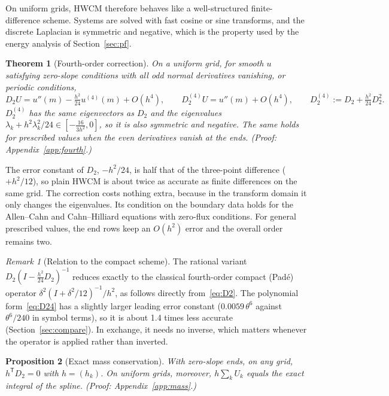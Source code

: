 \documentclass[preprint,12pt]{elsarticle}
\newtheorem{theorem}{Theorem}
\newtheorem{proposition}[theorem]{Proposition}
\theoremstyle{remark}
\newtheorem{remark}{Remark}
\newcommand{\proofin}[1]{\hfill{\small\emph{(Proof: Appendix~\ref{#1}.)}}}
\begin{document}
On uniform grids, HWCM therefore behaves like a well-structured finite-difference scheme. Systems are
solved with fast cosine or sine transforms, and the discrete Laplacian is symmetric and negative, which
is the property used by the energy analysis of Section~\ref{sec:pf}.

\begin{theorem}[Fourth-order correction]\label{thm:fourth}
On a uniform grid, for smooth $u$ satisfying zero-slope conditions with all odd normal derivatives
vanishing, or periodic conditions,
\begin{equation}\label{eq:D24}
D_2U=u''(m)-\tfrac{h^2}{24}u^{(4)}(m)+O(h^4),\qquad
D_2^{(4)}U=u''(m)+O(h^4),\qquad D_2^{(4)}:=D_2+\tfrac{h^2}{24}D_2^2 .
\end{equation}
$D_2^{(4)}$ has the same eigenvectors as $D_2$ and the eigenvalues
$\lambda_k+h^2\lambda_k^2/24\in[-\tfrac{16}{3h^2},0]$, so it is also symmetric and negative. The same holds
for prescribed values when the even derivatives vanish at the ends.
\proofin{app:fourth}
\end{theorem}

The error constant of $D_2$, $-h^2/24$, is half that of the three-point difference ($+h^2/12$), so plain
HWCM is about twice as accurate as finite differences on the same grid. The correction costs nothing
extra, because in the transform domain it only changes the eigenvalues. Its condition on the boundary
data holds for the Allen--Cahn and Cahn--Hilliard equations with zero-flux conditions. For general
prescribed values, the end rows keep an $O(h^2)$ error and the overall order remains two.

\begin{remark}[Relation to the compact scheme]
The rational variant $D_2(I-\tfrac{h^2}{24}D_2)^{-1}$ reduces exactly to the classical fourth-order
compact (Pad\'e) operator $\delta^2(I+\delta^2/12)^{-1}/h^2$, as follows directly from~\eqref{eq:D2}.
The polynomial form~\eqref{eq:D24} has a slightly larger leading error constant ($0.0059\,\theta^6$
against $\theta^6/240$ in symbol terms), so it is about 1.4 times less accurate
(Section~\ref{sec:compare}). In exchange, it needs no inverse, which matters whenever the operator is
applied rather than inverted.
\end{remark}

\begin{proposition}[Exact mass conservation]\label{prop:mass}
With zero-slope ends, on any grid, $h^{\mathsf T}D_2=0$ with $h=(h_k)$. On uniform grids, moreover,
$h\sum_kU_k$ equals the exact integral of the spline.
\proofin{app:mass}
\end{proposition}
\end{document}
